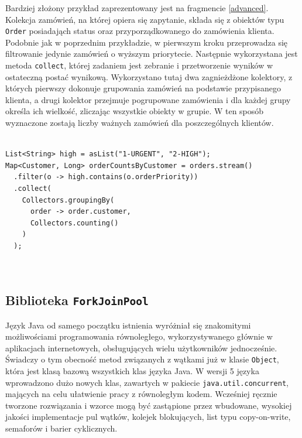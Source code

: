 \documentclass[12pt]{extarticle}
\begin{document}
    Bardziej złożony przykład zaprezentowany jest na fragmencie \ref{advanced}. Kolekcja zamówień, na której opiera się zapytanie, składa się z obiektów typu \texttt{Order} posiadająch status oraz przyporządkowanego do zamówienia klienta. Podobnie jak w poprzednim przykładzie, w pierwszym kroku przeprowadza się filtrowanie jedynie zamówień o wyższym priorytecie. Następnie wykorzystana jest metoda \texttt{collect}, której zadaniem jest zebranie i przetworzenie wyników w ostateczną postać wynikową. Wykorzystano tutaj dwa zagnieżdżone kolektory, z których pierwszy dokonuje grupowania zamówień na podstawie przypisanego klienta, a drugi kolektor przejmuje pogrupowane zamówienia i dla każdej grupy określa ich wielkość, zliczając wszystkie obiekty w grupie. W ten sposób wyznaczone zostają liczby ważnych zamówień dla poszczególnych klientów.

\begin{lstlisting}[label=advanced, caption=Zaawansowane wykorzystanie Stream API]

List<String> high = asList("1-URGENT", "2-HIGH");
Map<Customer, Long> orderCountsByCustomer = orders.stream()
  .filter(o -> high.contains(o.orderPriority))
  .collect(
    Collectors.groupingBy(
      order -> order.customer,
      Collectors.counting()
    )
  );
  
    

\end{lstlisting}

\subsection{Biblioteka \texttt{ForkJoinPool}}

    Język Java od samego początku istnienia wyróżniał się znakomitymi możliwościami programowania równoległego, wykorzystywanego głównie w aplikacjach internetowych, obsługujących wielu użytkowników jednocześnie. Świadczy o tym obecność metod związanych z wątkami już w klasie \texttt{Object}, która jest klasą bazową wszystkich klas języka Java. W wersji 5 języka wprowadzono dużo nowych klas, zawartych w pakiecie \texttt{java.util.concurrent}, mających na celu ułatwienie pracy z równoległym kodem. Wcześniej ręcznie tworzone rozwiązania i wzorce mogą być zastąpione przez wbudowane, wysokiej jakości implementacje pul wątków, kolejek blokujących, list typu copy-on-write, semaforów i barier cyklicznych.
    
\end{document}
